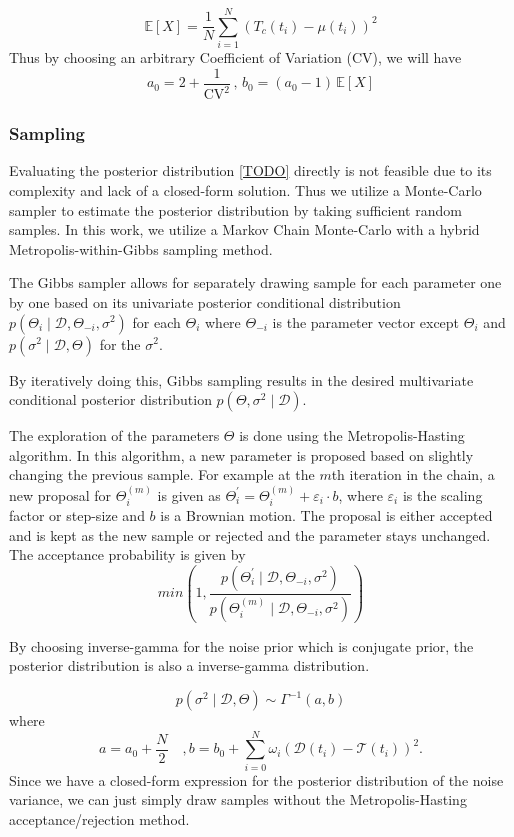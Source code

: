 \[
	\mathbb{E}[X] = \frac{1}{N} \sum_{i=1}^{N} (T_c(t_i) - \mu(t_i))^2
\]
Thus by choosing an arbitrary Coefficient of Variation (CV), we will have
\[
	a_0 = 2 + \frac{1}{\mathrm{CV}^2}\, , \, b_0 = (a_0 - 1) \, \mathbb{E}[X]
\]
\subsubsection{Sampling}

Evaluating the posterior distribution \ref{TODO} directly is not feasible due to its complexity and lack of a closed-form solution.
Thus we utilize a Monte-Carlo sampler to estimate the posterior distribution by taking sufficient random samples.
In this work, we utilize a Markov Chain Monte-Carlo with a hybrid Metropolis-within-Gibbs sampling method.

The Gibbs sampler allows for separately drawing sample for each parameter one by one based on its univariate posterior conditional distribution $p(\Theta_i \mid \mathcal{D}, \Theta_{-i}, \sigma^2)$ for each $\Theta_i$ where $\Theta_{-i}$ is the parameter vector except $\Theta_i$ and $p(\sigma^2 \mid \mathcal{D},\Theta)$ for the $\sigma^2$.

By iteratively doing this, Gibbs sampling results in the desired multivariate conditional posterior distribution $p(\Theta,\sigma^2 \mid \mathcal{D})$.

The exploration of the parameters $\Theta$ is done using the Metropolis-Hasting algorithm.
In this algorithm, a new parameter is proposed based on slightly changing the previous sample.
For example at the $m$th iteration in the chain, a new proposal for $\Theta_{i}^{(m)}$ is given as $\Theta_{i}^\prime = \Theta_{i}^{(m)} + \varepsilon_{i} \cdot b$, where $\varepsilon_{i}$ is the scaling factor or step-size and $b$ is a Brownian motion.
The proposal is either accepted and is kept as the new sample or rejected and the parameter stays unchanged.
The acceptance probability is given by
\[
	min\left(1,\frac{p(\Theta_i^\prime \mid \mathcal{D}, \Theta_{-i}, \sigma^2)}{p(\Theta_i^{(m)}\mid \mathcal{D}, \Theta_{-i}, \sigma^2)}\right)
\]

By choosing inverse-gamma for the noise prior which is conjugate prior, the posterior distribution is also a inverse-gamma distribution.

\[
	p(\sigma^2 \mid \mathcal{D},\Theta) \sim \Gamma^{-1}(a, b)
\]
where
\[
	a=a_0 + \frac{N}{2} \quad, b= b_0 + \sum_{i=0}^N \omega_i(\mathcal{D}(t_i) - \mathcal{T}(t_i))^2.
\]
Since we have a closed-form expression for the posterior distribution of the noise variance, we can just simply draw samples without the Metropolis-Hasting acceptance/rejection method.


